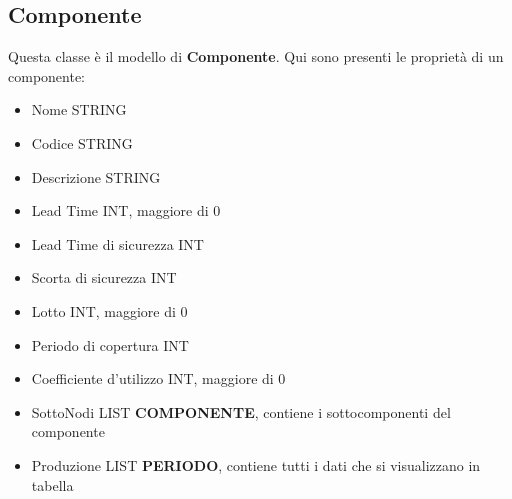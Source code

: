 \documentclass[12pt,twoside]{report}
\begin{document}
\subsection{Componente}

Questa classe è il modello di \textbf{Componente}. Qui sono presenti le proprietà di un componente:

\begin{itemize}
	\bigskip
	\bigskip
	\item Nome \space\space\space\space\space\space STRING
	\item Codice \space\space\space\space\space\space STRING
	\item Descrizione \space\space\space\space\space\space STRING
	\item Lead Time \space\space\space\space\space\space INT, maggiore di 0 
	\item Lead Time di sicurezza \space\space\space\space\space\space INT
	\item Scorta di sicurezza \space\space\space\space\space\space INT
	\item Lotto \space\space\space\space\space\space INT, maggiore di 0 
	\item Periodo di copertura  \space\space\space\space\space\space INT
	\item Coefficiente d’utilizzo \space\space\space\space\space\space INT, maggiore di 0 
	\item SottoNodi \space\space\space\space\space\space     LIST \textbf{COMPONENTE}, contiene i sottocomponenti del componente
	\item Produzione \space\space\space\space\space\space     LIST \textbf{PERIODO}, contiene tutti i dati che si visualizzano in tabella
	      	      
\end{itemize}
\end{document}
